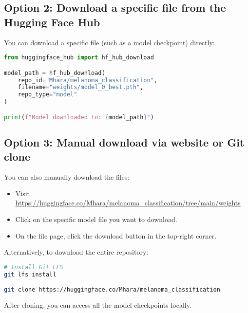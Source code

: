 \subsection{Option 2: Download a specific file from the Hugging Face Hub}

You can download a specific file (such as a model checkpoint) directly:

\begin{lstlisting}[language=Python, caption={Download specific model weight file}, label={lst:hf_hub_download}]
from huggingface_hub import hf_hub_download

model_path = hf_hub_download(
    repo_id="Mhara/melanoma_classification",
    filename="weights/model_0_best.pth", 
    repo_type="model"
)

print(f"Model downloaded to: {model_path}")
\end{lstlisting}

\subsection{Option 3: Manual download via website or Git clone}

You can also manually download the files:

\begin{itemize}
    \item Visit \url{https://huggingface.co/Mhara/melanoma_classification/tree/main/weights}
    \item Click on the specific model file you want to download.
    \item On the file page, click the download button in the top-right corner.
\end{itemize}

Alternatively, to download the entire repository:

\begin{lstlisting}[language=bash, caption={Clone the model repository with Git LFS}, label={lst:git_clone}]
# Install Git LFS
git lfs install

git clone https://huggingface.co/Mhara/melanoma_classification
\end{lstlisting}

\noindent
After cloning, you can access all the model checkpoints locally.


